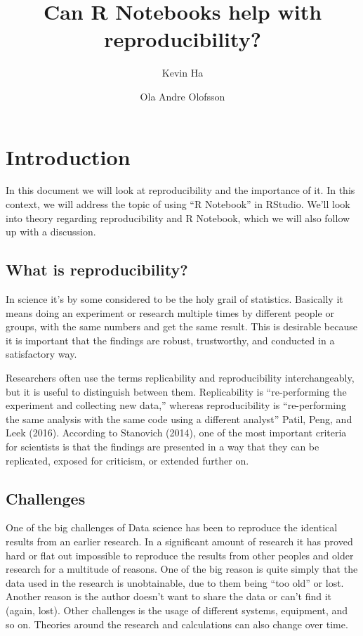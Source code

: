 \documentclass[
  12pt,
  twoside]{article}
\title{Can R Notebooks help with reproducibility?}
\author{Kevin Ha \and Ola Andre Olofsson}
\date{}
\begin{document}
\maketitle

\hypertarget{introduction}{%
\section{Introduction}\label{introduction}}

In this document we will look at reproducibility and the importance of
it. In this context, we will address the topic of using ``R Notebook''
in RStudio. We'll look into theory regarding reproducibility and R
Notebook, which we will also follow up with a discussion.

\hypertarget{what-is-reproducibility}{%
\subsection{What is reproducibility?}\label{what-is-reproducibility}}

In science it's by some considered to be the holy grail of statistics.
Basically it means doing an experiment or research multiple times by
different people or groups, with the same numbers and get the same
result. This is desirable because it is important that the findings are
robust, trustworthy, and conducted in a satisfactory way.

Researchers often use the terms replicability and reproducibility
interchangeably, but it is useful to distinguish between them.
Replicability is ``re-performing the experiment and collecting new
data,'' whereas reproducibility is ``re-performing the same analysis
with the same code using a different analyst'' Patil, Peng, and Leek
(2016). According to Stanovich (2014), one of the most important
criteria for scientists is that the findings are presented in a way that
they can be replicated, exposed for criticism, or extended further on.

\hypertarget{challenges}{%
\subsection{Challenges}\label{challenges}}

One of the big challenges of Data science has been to reproduce the
identical results from an earlier research. In a significant amount of
research it has proved hard or flat out impossible to reproduce the
results from other peoples and older research for a multitude of
reasons. One of the big reason is quite simply that the data used in the
research is unobtainable, due to them being ``too old'' or lost. Another
reason is the author doesn't want to share the data or can't find it
(again, lost). Other challenges is the usage of different systems,
equipment, and so on. Theories around the research and calculations can
also change over time.
\end{document}
